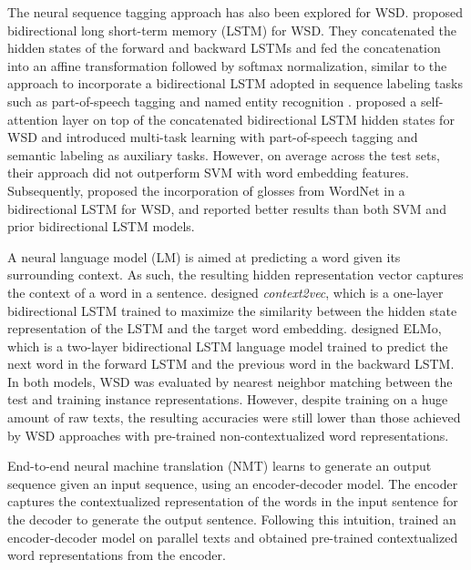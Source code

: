\documentclass[11pt,a4paper]{article}
\begin{document}
The neural sequence tagging approach has also been explored for WSD. \citet{kageback_word_2016} proposed bidirectional long short-term memory (LSTM) \cite{hochreiter_long_1997} for WSD. They concatenated the hidden states of the forward and backward LSTMs and fed the concatenation into an affine transformation followed by softmax normalization, similar to the approach to incorporate a bidirectional LSTM adopted in sequence labeling tasks such as part-of-speech tagging and named entity recognition \cite{ma_end--end_2016}. \citet{raganato_neural_2017} proposed a self-attention layer on top of the concatenated bidirectional LSTM hidden states for WSD and introduced multi-task learning with part-of-speech tagging and semantic labeling as auxiliary tasks. However, on average across the test sets, their approach did not outperform SVM with word embedding features. Subsequently, \citet{luo_incorporating_2018} proposed the incorporation of glosses from WordNet in a bidirectional LSTM for WSD, and reported better results than both SVM and prior bidirectional LSTM models.

A neural language model (LM) is aimed at predicting a word given its surrounding context. As such, the resulting hidden representation vector captures the context of a word in a sentence. \citet{melamud_context2vec:_2016} designed \textit{context2vec}, which is a one-layer bidirectional LSTM trained to maximize the similarity between the hidden state representation of the LSTM and the target word embedding. \citet{peters_deep_2018} designed ELMo, which is a two-layer bidirectional LSTM language model trained to predict the next word in the forward LSTM and the previous word in the backward LSTM. In both models, WSD was evaluated by nearest neighbor matching between the test and training instance representations. However, despite training on a huge amount of raw texts, the resulting accuracies were still lower than those achieved by WSD approaches with pre-trained non-contextualized word representations.

End-to-end neural machine translation (NMT) \cite{sutskever_sequence_2014,bahdanau_neural_2015} learns to generate an output sequence given an input sequence, using an encoder-decoder model. The encoder captures the contextualized representation of the words in the input sentence for the decoder to generate the output sentence. Following this intuition, \citet{mccann_learned_2017} trained an encoder-decoder model on parallel texts and obtained pre-trained contextualized word representations from the encoder.
\end{document}
